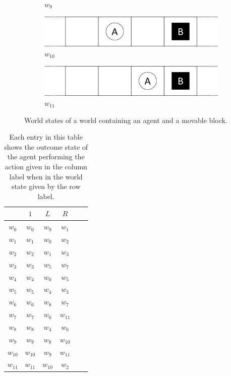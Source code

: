 \begin{figure}[htbp]
\begin{subfigure}{0.48\textwidth}
    \caption{$w_{9}$}
  \end{subfigure}%
    \vspace{0.5cm}
  \begin{subfigure}{0.48\textwidth}
    \centering
    \includegraphics[width=\textwidth]{5BeyondSBDRL/Old/Images/Movable_block_world_states/w10.png}
    \caption{$w_{10}$}
  \end{subfigure}%
  \hfill
  \begin{subfigure}{0.48\textwidth}
    \centering
    \includegraphics[width=\textwidth]{5BeyondSBDRL/Old/Images/Movable_block_world_states/w11.png}
    \caption{$w_{11}$}
  \end{subfigure}%
  \caption{World states of a world containing an agent and a movable block.}
  \label{fig:movable_block_world_states}
\end{figure}

\begin{table}[H]
    \centering
    \begin{tabular}{c|c c c c c}
                &  $1$      & $L$      & $R$\\
         \hline
        $w_{0}$ & $w_{0}$   & $w_{9}$   & $w_{1}$\\
        $w_{1}$ & $w_{1}$   & $w_{0}$   & $w_{2}$\\
        $w_{2}$ & $w_{2}$   & $w_{1}$   & $w_{3}$\\
        $w_{3}$ & $w_{3}$   & $w_{5}$   & $w_{7}$\\
        $w_{4}$ & $w_{4}$   & $w_{0}$   & $w_{5}$\\
        $w_{5}$ & $w_{5}$   & $w_{4}$   & $w_{3}$\\
        $w_{6}$ & $w_{6}$   & $w_{8}$   & $w_{7}$\\
        $w_{7}$ & $w_{7}$   & $w_{6}$   & $w_{11}$\\
        $w_{8}$ & $w_{8}$   & $w_{4}$   & $w_{6}$\\
        $w_{9}$ & $w_{9}$   & $w_{8}$   & $w_{10}$\\
        $w_{10}$ & $w_{10}$ & $w_{9}$   & $w_{11}$\\
        $w_{11}$ & $w_{11}$ & $w_{10}$  & $w_{2}$\\
    \end{tabular}
    \caption{
    Each entry in this table shows the outcome state of the agent performing the action given in the column label when in the world state given by the row label.
    }
    \label{tab:4x1-gridworld-minimum-transitions-moveable-block}
\end{table}

